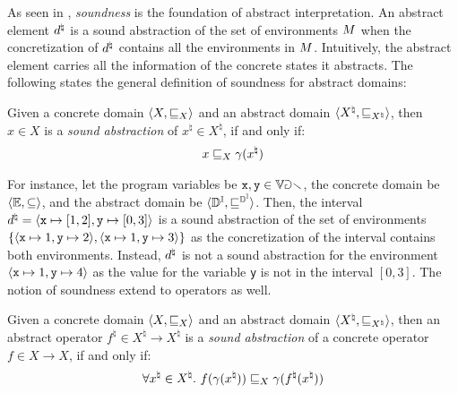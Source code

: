 \begin{description}
    As seen in , \emph{soundness} is the foundation of abstract interpretation. An abstract element $d^\natural$ is a sound abstraction of the set of environments $M$ when the concretization of $d^\natural$ contains all the environments in $M$. Intuitively, the abstract element carries all the information of the concrete states it abstracts. The following states the general definition of soundness for abstract domains:
    \begin{definition}
      Given a concrete domain $\langle X, \sqsubseteq_X \rangle$ and an abstract domain $\langle X^\natural, \sqsubseteq_{X^\natural} \rangle$, then $x\in X$ is a \emph{sound abstraction} of $x^\natural\in X^\natural$, if and only if:
    \begin{align*}
      x \sqsubseteq_X \gamma(x^\natural)
    \end{align*}
    \end{definition}
    For instance, let the program variables be $\textup{\texttt{x}}, \texttt{y} \in \mathbb{Var}$, the concrete domain be $\langle \mathbb{E}, \subseteq \rangle$, and the abstract domain be $\langle \mathbb{D}^{\mathbb{I}}, \sqsubseteq^{\mathbb{D}^{\mathbb{I}}} \rangle$.
    Then, the interval $d^\natural = \langle \textup{\texttt{x}} \mapsto [1, 2], \texttt{y} \mapsto [0, 3] \rangle$ is a sound abstraction of the set of environments $\{\langle \textup{\texttt{x}}\mapsto 1, \texttt{y}\mapsto 2 \rangle, \langle \textup{\texttt{x}}\mapsto 1, \texttt{y}\mapsto 3 \rangle\}$ as the concretization of the interval contains both environments. Instead, $d^\natural$ is not a sound abstraction for the environment $\langle \textup{\texttt{x}}\mapsto 1, \texttt{y}\mapsto 4 \rangle$ as the value for the variable \texttt{y} is not in the interval $[0, 3]$.
%
    The notion of soundness extend to operators as well.
    \begin{definition}
      Given a concrete domain $\langle X, \sqsubseteq_X \rangle$ and an abstract domain $\langle X^\natural, \sqsubseteq_{X^\natural} \rangle$, then an abstract operator $f^\natural\in X^\natural \to X^\natural$ is a \emph{sound abstraction} of a concrete operator $f\in X \to X$, if and only if:
    \begin{align*}
      \forall x^\natural \in X^\natural.~ f(\gamma(x^\natural)) \sqsubseteq_X \gamma(f^\natural(x^\natural))
    \end{align*}
    \end{definition}

\end{description}
